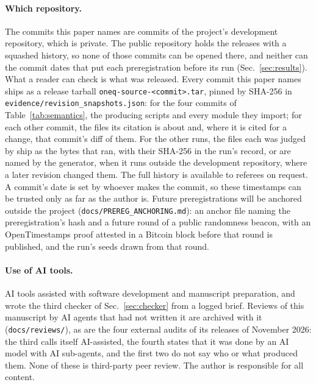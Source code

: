 \documentclass[aps,pra,twocolumn,superscriptaddress,nofootinbib,longbibliography,floatfix]{revtex4-2}
\begin{document}
\paragraph*{Which repository.} The commits this paper names are commits of the project's development repository, which is private. The public repository holds the releases with a squashed history, so none of those commits can be opened there, and neither can the commit dates that put each preregistration before its run (Sec.~\ref{sec:results}). What a reader can check is what was released. Every commit this paper names ships as a release tarball \texttt{oneq-source-<commit>.tar}, pinned by SHA-256 in \nolinkurl{evidence/revision_snapshots.json}: for the four commits of Table~\ref{tab:semantics}, the producing scripts and every module they import; for each other commit, the files its citation is about and, where it is cited for a change, that commit's diff of them. For the other runs, the files each was judged by ship as the bytes that ran, with their SHA-256 in the run's record, or are named by the generator, when it runs outside the development repository, where a later revision changed them. The full history is available to referees on request. A commit's date is set by whoever makes the commit, so these timestamps can be trusted only as far as the author is. Future preregistrations will be anchored outside the project (\nolinkurl{docs/PREREG_ANCHORING.md}): an anchor file naming the preregistration's hash and a future round of a public randomness beacon, with an OpenTimestamps proof attested in a Bitcoin block before that round is published, and the run's seeds drawn from that round.

\paragraph*{Use of AI tools.} AI tools assisted with software development and manuscript preparation, and wrote the third checker of Sec.~\ref{sec:checker} from a logged brief. Reviews of this manuscript by AI agents that had not written it are archived with it (\nolinkurl{docs/reviews/}), as are the four external audits of its releases of November 2026: the third calls itself AI-assisted, the fourth states that it was done by an AI model with AI sub-agents, and the first two do not say who or what produced them. None of these is third-party peer review. The author is responsible for all content.

\appendix

\end{document}
